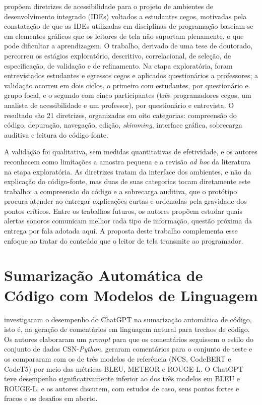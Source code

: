 \documentclass[
    12pt,                   %
    openright,              %
    oneside,                %
    a4paper,                %
    sumario=tradicional,    %
    english,                %
    brazil,                 %
    ]{abntex2}
\begin{document}
\textcite{latinoware37693} propõem diretrizes de acessibilidade para o projeto de ambientes de desenvolvimento integrado (IDEs) voltados a estudantes cegos, motivadas pela constatação de que as IDEs utilizadas em disciplinas de programação baseiam-se em elementos gráficos que os leitores de tela não suportam plenamente, o que pode dificultar a aprendizagem. O trabalho, derivado de uma tese de doutorado, percorreu os estágios exploratório, descritivo, correlacional, de seleção, de especificação, de validação e de refinamento. Na etapa exploratória, foram entrevistados estudantes e egressos cegos e aplicados questionários a professores; a validação ocorreu em dois ciclos, o primeiro com estudantes, por questionário e grupo focal, e o segundo com cinco participantes (três programadores cegos, um analista de acessibilidade e um professor), por questionário e entrevista. O resultado são 21 diretrizes, organizadas em oito categorias: compreensão do código, depuração, navegação, edição, \textit{skimming}, interface gráfica, sobrecarga auditiva e leitura do código-fonte.

A validação foi qualitativa, sem medidas quantitativas de efetividade, e os autores reconhecem como limitações a amostra pequena e a revisão \textit{ad hoc} da literatura na etapa exploratória. As diretrizes tratam da interface dos ambientes, e não da explicação do código-fonte, mas duas de suas categorias tocam diretamente este trabalho: a compreensão do código e a sobrecarga auditiva, que o protótipo procura atender ao entregar explicações curtas e ordenadas pela gravidade dos pontos críticos. Entre os trabalhos futuros, os autores propõem estudar quais alertas sonoros comunicam melhor cada tipo de informação, questão próxima da entrega por fala adotada aqui. A proposta deste trabalho complementa esse enfoque ao tratar do conteúdo que o leitor de tela transmite ao programador.

\section{Sumarização Automática de Código com Modelos de Linguagem}

\textcite{sun2023chatgptsum} investigaram o desempenho do ChatGPT na sumarização automática de código, isto é, na geração de comentários em linguagem natural para trechos de código. Os autores elaboraram um \textit{prompt} para que os comentários seguissem o estilo do conjunto de dados CSN-\textit{Python}, geraram comentários para o conjunto de teste e os compararam com os de três modelos de referência (NCS, CodeBERT e CodeT5) por meio das métricas BLEU, METEOR e ROUGE-L. O ChatGPT teve desempenho significativamente inferior ao dos três modelos em BLEU e ROUGE-L, e os autores discutem, com estudos de caso, seus pontos fortes e fracos e os desafios em aberto.
\end{document}
